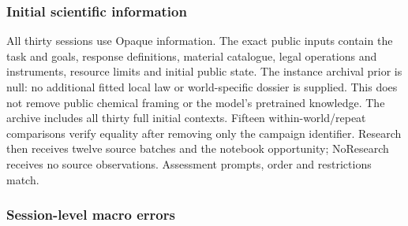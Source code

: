 \documentclass[10pt,a4paper]{article}
\begin{document}
\subsubsection{Initial scientific information}\label{initial-scientific-information}

All thirty sessions use Opaque information. The exact public inputs contain the task and goals, response definitions, material catalogue, legal operations and instruments, resource limits and initial public state. The instance archival prior is null: no additional fitted local law or world-specific dossier is supplied. This does not remove public chemical framing or the model's pretrained knowledge. The archive includes all thirty full initial contexts. Fifteen within-world/repeat comparisons verify equality after removing only the campaign identifier. Research then receives twelve source batches and the notebook opportunity; NoResearch receives no source observations. Assessment prompts, order and restrictions match.

\subsubsection{Session-level macro errors}\label{session-level-macro-errors}
\end{document}
